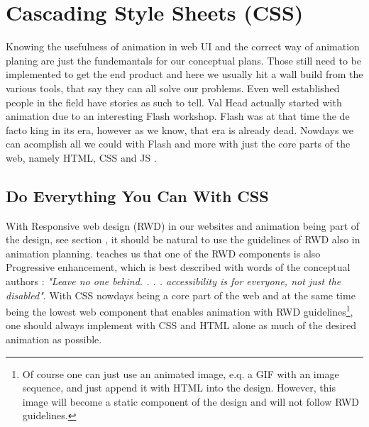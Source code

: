 %
%
% 
% 
% 


\chapter{Cascading Style Sheets (CSS)}

\label{chap:CSS}

Knowing the usefulness of animation in web UI and the correct way of animation planing are just the fundemantals for our conceptual plans. Those still need to be implemented to get the end product and here we usually hit a wall build from the various tools, that say they can all solve our problems. Even well established people in the field have stories as such to tell. Val Head actually started with animation due to an interesting Flash workshop. Flash was at that time the de facto king in its era, however as we know, that era is already dead. Nowdays we can acomplish
all we could with Flash and more with just the core parts of the web, namely HTML, CSS and JS
\citep{head2016designing}.

\section{Do Everything You Can With CSS}

\label{sec:everythingCSS}

With Responsive web design (RWD) in our websites and animation being part of the design, see section \TODO{\ref{chap:Animation}}, it should be natural to use the guidelines of RWD also in animation planning. \citet{IAWEB} teaches us that one of the RWD components is also Progressive enhancement, which is best described with words of the conceptual authors \citet{champeon2003inclusive}: {\em"Leave no one behind. . . .  accessibility is for everyone, not just the disabled"}. With CSS nowdays being a core part of the web and at the same time being the lowest web component that enables animation with RWD guidelines\footnote{Of course one can just use an animated image, e.q. a GIF with an image sequence, and just append it with HTML into the design. However, this image will become a static component of the design and will not follow RWD guidelines.}, one should always implement with CSS and HTML alone as much of the desired animation as possible.

